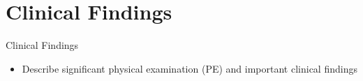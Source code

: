 \section{Clinical Findings}

\begin{frame}{Clinical Findings}
    \begin{itemize}
        \item Describe significant physical examination (PE) and important clinical findings
    \end{itemize}
\end{frame}
